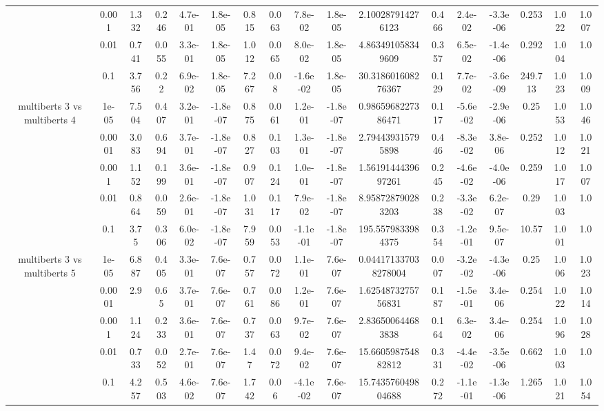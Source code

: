 \begin{tabular}{|c|c|c|c|c|c|c|c|c|c|c|c|c|c|c|c|c|}
 & 0.001 & 1.332 & 0.246 & 4.7e-01 & 1.8e-05 & 0.815 & 0.063 & 7.8e-02 & 1.8e-05 & 2.100287914276123 & 0.466 & 2.4e-02 & -3.3e-06 & 0.253 & 1.022 & 1.007 \\
 & 0.01 & 0.741 & 0.055 & 3.3e-01 & 1.8e-05 & 1.012 & 0.065 & 8.0e-02 & 1.8e-05 & 4.863491058349609 & 0.357 & 6.5e-02 & -1.4e-06 & 0.292 & 1.004 & 1.0 \\
 & 0.1 & 3.756 & 0.22 & 6.9e-02 & 1.8e-05 & 7.267 & 0.08 & -1.6e-02 & 1.8e-05 & 30.318601608276367 & 0.129 & 7.7e-02 & -3.6e-09 & 249.713 & 1.023 & 1.009 \\
\hline
\multirow{5}{*}{multiberts 3 vs multiberts 4} & 1e-05 & 7.504 & 0.407 & 3.2e-01 & -1.8e-07 & 0.875 & 0.061 & 1.2e-01 & -1.8e-07 & 0.9865968227386471 & 0.117 & -5.6e-02 & -2.9e-06 & 0.25 & 1.053 & 1.046 \\
 & 0.0001 & 3.083 & 0.694 & 3.7e-01 & -1.8e-07 & 0.827 & 0.103 & 1.3e-01 & -1.8e-07 & 2.794439315795898 & 0.446 & -8.3e-02 & 3.8e-06 & 0.252 & 1.012 & 1.021 \\
 & 0.001 & 1.152 & 0.199 & 3.6e-01 & -1.8e-07 & 0.907 & 0.124 & 1.0e-01 & -1.8e-07 & 1.5619144439697261 & 0.245 & -4.6e-02 & -4.0e-06 & 0.259 & 1.017 & 1.007 \\
 & 0.01 & 0.864 & 0.059 & 2.6e-01 & -1.8e-07 & 1.031 & 0.117 & 7.9e-02 & -1.8e-07 & 8.958728790283203 & 0.238 & -3.3e-02 & 6.2e-07 & 0.29 & 1.003 & 1.0 \\
 & 0.1 & 3.75 & 0.306 & 6.0e-02 & -1.8e-07 & 7.959 & 0.053 & -1.1e-01 & -1.8e-07 & 195.5579833984375 & 0.354 & -1.2e-01 & 9.5e-07 & 10.57 & 1.001 & 1.0 \\
\hline
\multirow{5}{*}{multiberts 3 vs multiberts 5} & 1e-05 & 6.887 & 0.405 & 3.3e-01 & 7.6e-07 & 0.757 & 0.072 & 1.1e-01 & 7.6e-07 & 0.044171337038278004 & 0.007 & -3.2e-02 & -4.3e-06 & 0.25 & 1.006 & 1.023 \\
 & 0.0001 & 2.9 & 0.65 & 3.7e-01 & 7.6e-07 & 0.761 & 0.086 & 1.2e-01 & 7.6e-07 & 1.6254873275756831 & 0.187 & -1.5e-01 & 3.4e-06 & 0.254 & 1.022 & 1.014 \\
 & 0.001 & 1.124 & 0.233 & 3.6e-01 & 7.6e-07 & 0.737 & 0.063 & 9.7e-02 & 7.6e-07 & 2.836500644683838 & 0.164 & 6.3e-02 & 3.4e-06 & 0.254 & 1.096 & 1.028 \\
 & 0.01 & 0.733 & 0.052 & 2.7e-01 & 7.6e-07 & 1.47 & 0.072 & 9.4e-02 & 7.6e-07 & 15.660598754882812 & 0.331 & -4.4e-02 & -3.5e-06 & 0.662 & 1.003 & 1.0 \\
 & 0.1 & 4.257 & 0.503 & 4.6e-02 & 7.6e-07 & 1.742 & 0.06 & -4.1e-02 & 7.6e-07 & 15.743576049804688 & 0.272 & -1.1e-01 & -1.3e-06 & 1.265 & 1.021 & 1.054 \\

\end{tabular}

